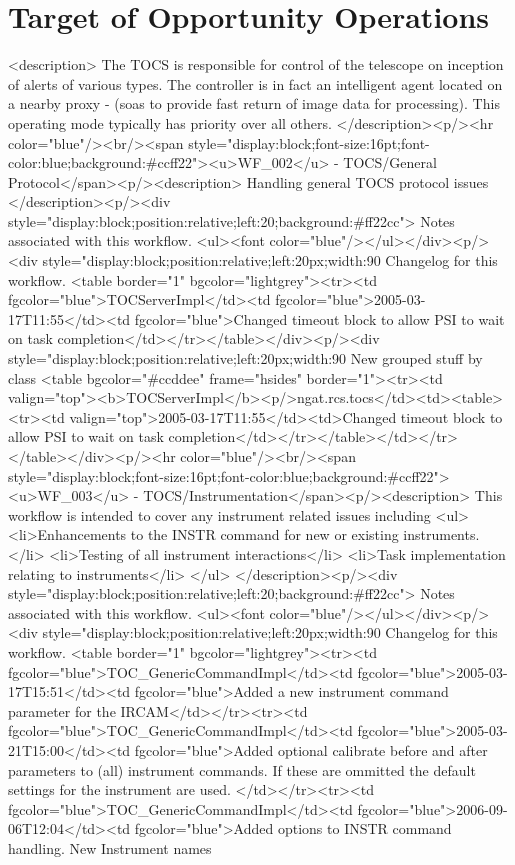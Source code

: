     \section{Target of Opportunity Operations}

    <description>
      The TOCS is responsible for control of the telescope on inception of alerts of various types. The controller
      is in fact an intelligent agent located on a nearby proxy - (soas to provide fast return of image data for
      processing). This operating mode typically has priority over all others.
    </description><p/><hr color="blue"/><br/><span style="display:block;font-size:16pt;font-color:blue;background:#ccff22"><u>WF_002</u> -    TOCS/General Protocol</span><p/><description>
	Handling general TOCS protocol issues      
      </description><p/><div style="display:block;position:relative;left:20;background:#ff22cc">
      Notes associated with this workflow.
      <ul><font color="blue"/></ul></div><p/><div style="display:block;position:relative;left:20px;width:90%
      Changelog for this workflow.
      <table border="1" bgcolor="lightgrey"><tr><td fgcolor="blue">TOCServerImpl</td><td fgcolor="blue">2005-03-17T11:55</td><td fgcolor="blue">Changed timeout block to allow PSI to wait on task completion</td></tr></table></div><p/><div style="display:block;position:relative;left:20px;width:90%
     New grouped stuff by class
     <table bgcolor="#ccddee" frame="hsides" border="1"><tr><td valign="top"><b>TOCServerImpl</b><p/>ngat.rcs.tocs</td><td><table><tr><td valign="top">2005-03-17T11:55</td><td>Changed timeout block to allow PSI to wait on task completion</td></tr></table></td></tr></table></div><p/><hr color="blue"/><br/><span style="display:block;font-size:16pt;font-color:blue;background:#ccff22"><u>WF_003</u> -    TOCS/Instrumentation</span><p/><description>           
	This workflow is intended to cover any instrument related issues including 
	<ul>
	  <li>Enhancements to the INSTR command for new or existing instruments.</li>
	  <li>Testing of all instrument interactions</li>
	  <li>Task implementation relating to instruments</li>
	</ul>
      </description><p/><div style="display:block;position:relative;left:20;background:#ff22cc">
      Notes associated with this workflow.
      <ul><font color="blue"/></ul></div><p/><div style="display:block;position:relative;left:20px;width:90%
      Changelog for this workflow.
      <table border="1" bgcolor="lightgrey"><tr><td fgcolor="blue">TOC_GenericCommandImpl</td><td fgcolor="blue">2005-03-17T15:51</td><td fgcolor="blue">Added a new instrument command parameter for the IRCAM</td></tr><tr><td fgcolor="blue">TOC_GenericCommandImpl</td><td fgcolor="blue">2005-03-21T15:00</td><td fgcolor="blue">Added optional calibrate before and after parameters to (all) instrument commands.
	    If these are ommitted the default settings for the instrument are used.
	  </td></tr><tr><td fgcolor="blue">TOC_GenericCommandImpl</td><td fgcolor="blue">2006-09-06T12:04</td><td fgcolor="blue">Added options to INSTR command handling. New Instrument names
             
